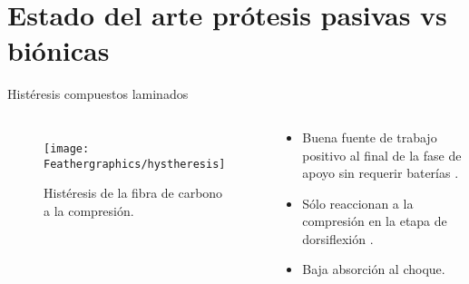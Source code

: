 \documentclass[10pt]{beamer}
\begin{document}
\section{Estado del arte prótesis pasivas vs biónicas}
\begin{frame}{Histéresis compuestos laminados}

\begin{columns}[t]


\column{70 mm}

\begin{figure}
\begin{centering}
\texttt{[image: Feathergraphics/hystheresis]}
\par\end{centering}
\caption{Histéresis de la fibra de carbono a la compresión. \cite{Nolan2008}}
\end{figure}


\column{50 mm}
\begin{alertblock}{}

\begin{itemize}
\item {\footnotesize{}Buena fuente de trabajo positivo al final de la fase
de apoyo sin requerir baterías \cite{Zelik2014}.}{\footnotesize \par}
\item {\footnotesize{}Sólo reaccionan a la compresión en la etapa de dorsiflexión
\cite{Varol2010}.}{\footnotesize \par}
\item {\footnotesize{}Baja absorción al choque\cite{Au2008}.}{\footnotesize \par}
\end{itemize}
\end{alertblock}
\end{columns}

\end{frame}
\end{document}
